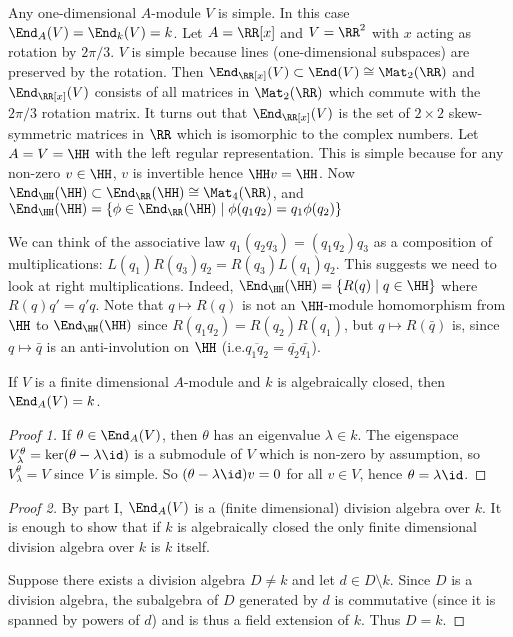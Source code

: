 \begin{exam}
	\begin{enum}
		\io Any one-dimensional $A$-module $V$ is simple.
		In this case $\End_A(V) = \End_k(V) = k$.
		\io Let $A=\RR[x]$ and $V=\RR^2$ with $x$ acting as rotation by $2\pi/3$.
		$V$ is simple because lines (one-dimensional subspaces) are preserved by the rotation.
		Then $\End_{\RR[x]}(V) \subset \End(V) \cong \Mat_2(\RR)$ and $\End_{\RR[x]}(V)$ consists of all matrices in $\Mat_2(\RR)$ which commute with the $2\pi/3$ rotation matrix.
		It turns out that $\End_{\RR[x]}(V)$ is the set of $2 \times 2$ skew-symmetric matrices in $\RR$ which is isomorphic to the complex numbers.
		\io Let $A=V=\HH$ with the left regular representation.
		This is simple because for any non-zero $v \in \HH$, $v$ is invertible hence $\HH v = \HH$.
		Now $\End_\HH(\HH) \subset \End_\RR(\HH) \cong \Mat_4(\RR)$, and $\End_\HH(\HH) = \{\phi \in \End_\RR(\HH) \mid \phi(q_1q_2) = q_1\phi(q_2)\}$
		
		We can think of the associative law $q_1(q_2q_3)=(q_1q_2)q_3$ as a composition of multiplications: $L(q_1)R(q_3)q_2=R(q_3)L(q_1)q_2$.
		This suggests we need to look at right multiplications.
		Indeed, $\End_\HH(\HH) = \{R(q) \mid q \in \HH\}$ where $R(q)q' = q'q$.
		Note that $q \mapsto R(q)$ is not an $\HH$-module homomorphism from $\HH$ to $\End_\HH(\HH)$ since $R(q_1q_2)=R(q_2)R(q_1)$, but $q \mapsto R(\bar{q})$ is, since $q \mapsto \bar q$ is an anti-involution on $\HH$ (i.e.\@ $\overline{q_1q_2}=\bar{q_2}\bar{q_1}$).
	\end{enum}
\end{exam}

\begin{thm}
	If $V$ is a finite dimensional $A$-module and $k$ is algebraically closed, then $\End_A(V)=k$.
\end{thm}

\begin{proof}[Proof 1]
	If $\theta \in \End_A(V)$, then $\theta$ has an eigenvalue $\lambda \in k$.
	The eigenspace $V_\lambda^\theta = \ker(\theta-\lambda\id)$ is a submodule of $V$ which is non-zero by assumption, so $V_\lambda^\theta=V$ since $V$ is simple.
	So $(\theta-\lambda\id)v=0$ for all $v \in V$, hence $\theta=\lambda\id$.
\end{proof}

\begin{proof}[Proof 2]
	By part I, $\End_A(V)$ is a (finite dimensional) division algebra over $k$.
	It is enough to show that if $k$ is algebraically closed the only finite dimensional division algebra over $k$ is $k$ itself.
	
	Suppose there exists a division algebra $D \neq k$ and let $d \in D \setminus k$.
	Since $D$ is a division algebra, the subalgebra of $D$ generated by $d$ is commutative (since it is spanned by powers of $d$) and is thus a field extension of $k$.
	Thus $D=k$.
\end{proof}

